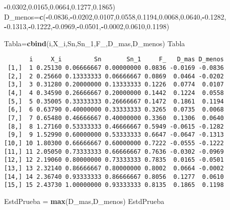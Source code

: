 \documentclass[a4paper,oneside,openany]{book}
\newenvironment{Shaded}{\begin{snugshade}}{\end{snugshade}}
\newcommand{\KeywordTok}[1]{\textcolor[rgb]{0.13,0.29,0.53}{\textbf{#1}}}
\newcommand{\DecValTok}[1]{\textcolor[rgb]{0.00,0.00,0.81}{#1}}
\newcommand{\FloatTok}[1]{\textcolor[rgb]{0.00,0.00,0.81}{#1}}
\newcommand{\StringTok}[1]{\textcolor[rgb]{0.31,0.60,0.02}{#1}}
\newcommand{\OperatorTok}[1]{\textcolor[rgb]{0.81,0.36,0.00}{\textbf{#1}}}
\newcommand{\NormalTok}[1]{#1}
\begin{document}
\begin{Shaded}
\begin{Highlighting}[]
                \OperatorTok{-}\FloatTok{0.0302}\NormalTok{,}\FloatTok{0.0165}\NormalTok{,}\FloatTok{0.0664}\NormalTok{,}\FloatTok{0.1277}\NormalTok{,}\FloatTok{0.1865}\NormalTok{)}
\NormalTok{D_menos=}\KeywordTok{c}\NormalTok{(}\OperatorTok{-}\FloatTok{0.0836}\NormalTok{,}\OperatorTok{-}\FloatTok{0.0202}\NormalTok{,}\FloatTok{0.0107}\NormalTok{,}\FloatTok{0.0558}\NormalTok{,}\FloatTok{0.1194}\NormalTok{,}\FloatTok{0.0068}\NormalTok{,}\FloatTok{0.0640}\NormalTok{,}\OperatorTok{-}\FloatTok{0.1282}\NormalTok{,}
          \OperatorTok{-}\FloatTok{0.1313}\NormalTok{,}\OperatorTok{-}\FloatTok{0.1222}\NormalTok{,}\OperatorTok{-}\FloatTok{0.0969}\NormalTok{,}\OperatorTok{-}\FloatTok{0.0501}\NormalTok{,}\OperatorTok{-}\FloatTok{0.0002}\NormalTok{,}\FloatTok{0.0610}\NormalTok{,}\FloatTok{0.1198}\NormalTok{)}

\NormalTok{Tabla=}\KeywordTok{cbind}\NormalTok{(i,X_i,Sn,Sn_}\DecValTok{1}\NormalTok{,F_,D_mas,D_menos)                                                                                                                                                      }
\NormalTok{Tabla}
\end{Highlighting}
\end{Shaded}

\begin{verbatim}
       i     X_i         Sn       Sn_1     F_   D_mas D_menos
 [1,]  1 0.25130 0.06666667 0.00000000 0.0836 -0.0169 -0.0836
 [2,]  2 0.25660 0.13333333 0.06666667 0.0869  0.0464 -0.0202
 [3,]  3 0.31280 0.20000000 0.13333333 0.1226  0.0774  0.0107
 [4,]  4 0.34590 0.26666667 0.20000000 0.1442  0.1224  0.0558
 [5,]  5 0.35005 0.33333333 0.26666667 0.1472  0.1861  0.1194
 [6,]  6 0.63790 0.40000000 0.33333333 0.3265  0.0735  0.0068
 [7,]  7 0.65480 0.46666667 0.40000000 0.3360  0.1306  0.0640
 [8,]  8 1.27160 0.53333333 0.46666667 0.5949 -0.0615 -0.1282
 [9,]  9 1.52990 0.60000000 0.53333333 0.6647 -0.0647 -0.1313
[10,] 10 1.80300 0.66666667 0.60000000 0.7222 -0.0555 -0.1222
[11,] 11 2.05050 0.73333333 0.66666667 0.7636 -0.0302 -0.0969
[12,] 12 2.19060 0.80000000 0.73333333 0.7835  0.0165 -0.0501
[13,] 13 2.32140 0.86666667 0.80000000 0.8002  0.0664 -0.0002
[14,] 14 2.36740 0.93333333 0.86666667 0.8056  0.1277  0.0610
[15,] 15 2.43730 1.00000000 0.93333333 0.8135  0.1865  0.1198
\end{verbatim}

\begin{Shaded}
\begin{Highlighting}[]
\NormalTok{EstdPrueba =}\StringTok{ }\KeywordTok{max}\NormalTok{(D_mas,D_menos)}
\NormalTok{EstdPrueba}
\end{Highlighting}
\end{Shaded}
\end{document}
